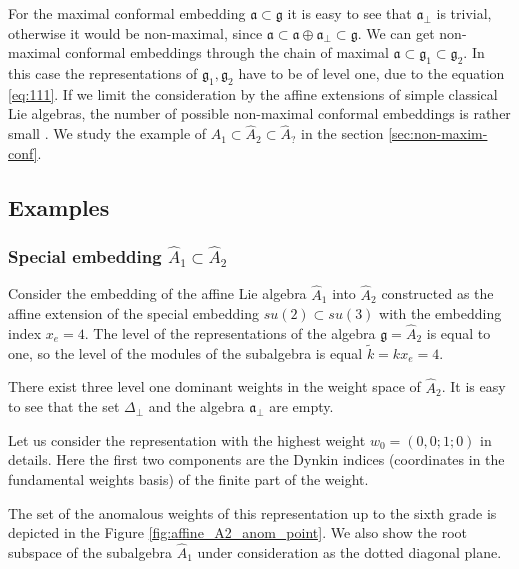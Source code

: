 \documentclass[a4paper,12pt]{article}
\theoremstyle{definition} \newtheorem{Def}{Definition}
\begin{document}
For the maximal conformal embedding $\mathfrak{a}\subset\mathfrak{g}$ it is easy to see that $\mathfrak{a}_{\bot}$ is trivial, otherwise it would be non-maximal, since $\mathfrak{a}\subset\mathfrak{a}\oplus\mathfrak{a}_{\bot}\subset\mathfrak{g}$. We can get non-maximal conformal embeddings through the chain of maximal $\mathfrak{a}\subset\mathfrak{g}_1\subset\mathfrak{g}_2$. In this case the representations of $\mathfrak{g}_1,\mathfrak{g}_2$ have to be of level one, due to the equation \eqref{eq:111}. If we limit the consideration by the affine extensions of simple classical Lie algebras, the number of possible non-maximal conformal embeddings is rather small \cite{schellekens1986conformal}. We study the example of $\hat{A}_1\subset \hat{A}_2\subset\hat{A}_{?}$ in the section \ref{sec:non-maxim-conf}.

\subsection{Examples}
\label{sec:example}

\subsubsection{Special embedding $\hat{A}_1\subset\hat{A}_2$}
\label{sec:spec-embedd-hata_1s}
Consider the embedding of the affine Lie algebra $\hat{A}_1$ into $\hat{A}_2$ constructed as the affine extension of the special embedding $su(2)\subset su(3)$ with the embedding index $x_e=4$. The level of the representations of the algebra $\mathfrak{g}=\hat{A}_2$ is equal to one, so the level of the modules of the subalgebra is equal $\tilde{k}=kx_e=4$.

There exist three level one dominant weights in the weight space of $\hat{A}_2$.
It is easy to see that the set $\Delta_{\bot}$ and the algebra $\mathfrak{a}_{\bot}$ are empty.

Let us consider the representation with the highest weight $w_0=(0,0;1;0)$ in details. Here the first two components are the Dynkin indices (coordinates in the fundamental weights basis) of the finite part of the weight.

The set of the anomalous weights of this representation up to the sixth grade is depicted in the Figure \ref{fig:affine_A2_anom_point}. We also show the root subspace of the subalgebra $\hat{A}_1$ under consideration as the dotted diagonal plane.
\end{document}
